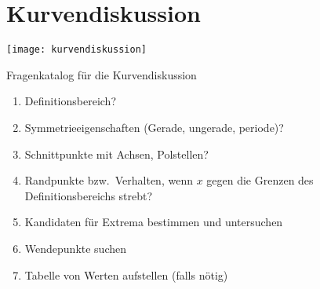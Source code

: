 \section{Kurvendiskussion}\label{sec:kurvendiskussion}

\begin{center}
    \texttt{[image: kurvendiskussion]}
\end{center}

\begin{definition}{Fragenkatalog für die Kurvendiskussion}
    \begin{enumerate}
        \item Definitionsbereich?
        \item Symmetrieeigenschaften (Gerade, ungerade, periode)?
        \item Schnittpunkte mit Achsen, Polstellen?
        \item Randpunkte bzw.\ Verhalten, wenn $x$ gegen die Grenzen des Definitionsbereichs strebt?
        \item Kandidaten für Extrema bestimmen und untersuchen
        \item Wendepunkte suchen
        \item Tabelle von Werten aufstellen (falls nötig)
    \end{enumerate}
\end{definition}